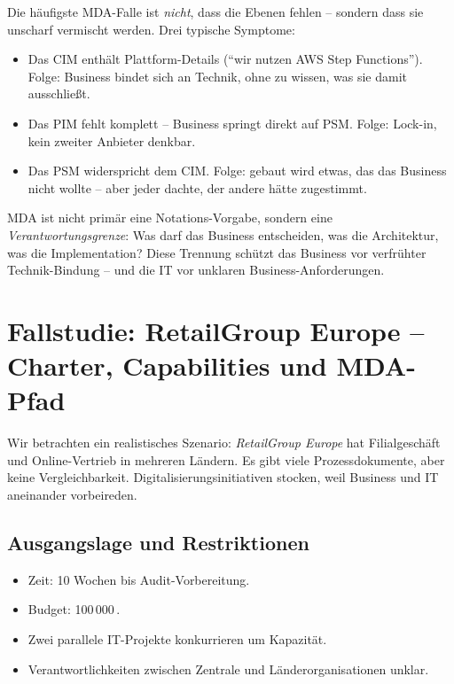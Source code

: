 \documentclass[11pt,a4paper,oneside]{article}
\begin{document}
Die häufigste MDA-Falle ist \emph{nicht}, dass die Ebenen fehlen -- sondern dass sie unscharf vermischt werden. Drei typische Symptome:

\begin{itemize}
  \item Das CIM enthält Plattform-Details (``wir nutzen AWS Step Functions''). Folge: Business bindet sich an Technik, ohne zu wissen, was sie damit ausschließt.
  \item Das PIM fehlt komplett -- Business springt direkt auf PSM. Folge: Lock-in, kein zweiter Anbieter denkbar.
  \item Das PSM widerspricht dem CIM. Folge: gebaut wird etwas, das das Business nicht wollte -- aber jeder dachte, der andere hätte zugestimmt.
\end{itemize}

\begin{merkbox}
MDA ist nicht primär eine Notations-Vorgabe, sondern eine \emph{Verantwortungsgrenze}: Was darf das Business entscheiden, was die Architektur, was die Implementation? Diese Trennung schützt das Business vor verfrühter Technik-Bindung -- und die IT vor unklaren Business-Anforderungen.
\end{merkbox}

\section{Fallstudie: RetailGroup Europe -- Charter, Capabilities und MDA-Pfad}

Wir betrachten ein realistisches Szenario: \emph{RetailGroup Europe} hat Filialgeschäft und Online-Vertrieb in mehreren Ländern. Es gibt viele Prozessdokumente, aber keine Vergleichbarkeit. Digitalisierungsinitiativen stocken, weil Business und IT aneinander vorbeireden.

\subsection{Ausgangslage und Restriktionen}

\begin{itemize}
  \item Zeit: 10 Wochen bis Audit-Vorbereitung.
  \item Budget: 100\,000\,\text{\euro}.
  \item Zwei parallele IT-Projekte konkurrieren um Kapazität.
  \item Verantwortlichkeiten zwischen Zentrale und Länderorganisationen unklar.
\end{itemize}
\end{document}
